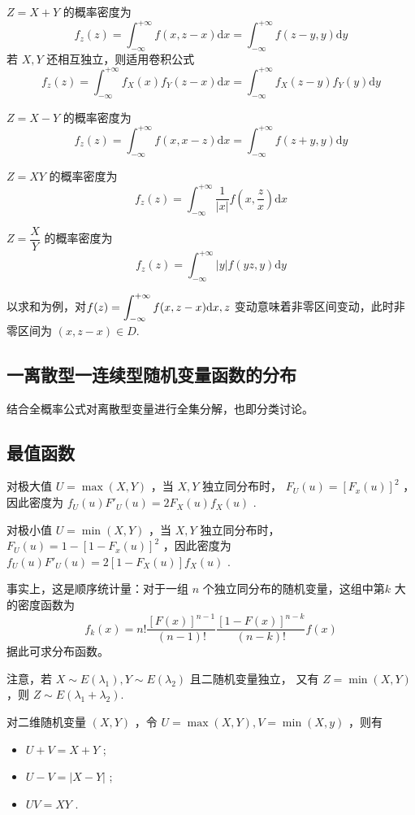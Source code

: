 
$ Z = X + Y $ 的概率密度为$$
    f_z(z) = \int_{-\infty}^{+\infty}f(x,z-x)\mathrm{d}x
    = \int_{-\infty}^{+\infty}f(z-y,y)\mathrm{d}y
$$ 
若 $ X,Y $ 还相互独立，则适用卷积公式$$
f_z(z) = \int_{-\infty}^{+\infty}f_X(x)f_Y(z-x)\mathrm{d}x
= \int_{-\infty}^{+\infty}f_X(z-y)f_Y(y)\mathrm{d}y
$$ 


$ Z = X - Y $ 的概率密度为$$
    f_z(z) = \int_{-\infty}^{+\infty}f(x,x-z)\mathrm{d}x
    = \int_{-\infty}^{+\infty}f(z+y,y)\mathrm{d}y
$$ 


$ Z = XY $ 的概率密度为$$
    f_z(z) = \int_{-\infty}^{+\infty}\dfrac{1}{|x|}f(x,\frac{z}{x})\mathrm{d}x
$$ 


$ Z = \dfrac{X}{Y} $ 的概率密度为$$
    f_z(z) = \int_{-\infty}^{+\infty}|y|f(yz,y)\mathrm{d}y
$$ 


以求和为例，对$ \displaystyle f(z) =\int_{-\infty}^{+\infty} f(x,z-x)\mathrm{d}x, z $
变动意味着非零区间变动，\newline 此时非零区间为 $ (x,z-x)\in D $.

\subsection{一离散型一连续型随机变量函数的分布}

结合全概率公式对离散型变量进行全集分解，也即分类讨论。

\subsection{最值函数}

对极大值 $ U = \max(X,Y) $ ，当 $ X,Y $ 独立同分布时，
$ F_U(u) = [F_x(u)]^2 $ ，因此密度为 $ f_U(u) F'_U(u) = 2F_X(u)f_X(u) $ .

对极小值 $ U = \min(X,Y) $ ，当 $ X,Y $ 独立同分布时，
$ F_U(u) = 1-[1-F_x(u)]^2 $ ，因此密度为 $ f_U(u) F'_U(u) = 2[1-F_X(u)]f_X(u) $ .

事实上，这是顺序统计量：对于一组 $ n $ 个独立同分布的随机变量，这组中第$ k $ 大的密度函数为
$$
    f_k(x) = n!\dfrac{[F(x)]^{n-1}}{(n-1)!}\dfrac{[1-F(x)]^{n-k}}{(n-k)!}f(x)
$$ 
据此可求分布函数。

注意，若 $ X\sim E(\lambda_1),Y\sim E(\lambda_2)$ 且二随机变量独立，
又有 $ Z = \min(X,Y) $ ，则 $ Z \sim E(\lambda_1+\lambda_2) $.

对二维随机变量 $ (X,Y) $ ，令 $ U = \max(X,Y),V = \min(X,y) $ ，则有
\begin{itemize}
    \item $ U + V = X + Y $ ;
    \item $ U - V = |X - Y| $ ;
    \item $ UV = XY $ .
\end{itemize}

